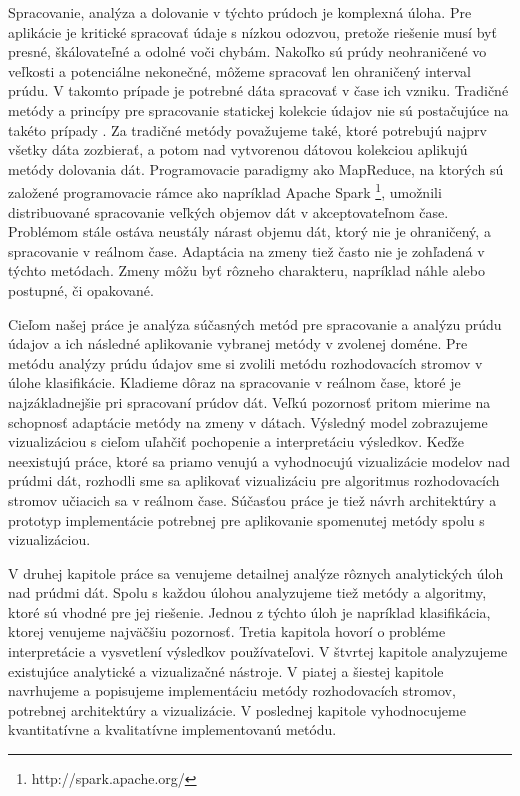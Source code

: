 \par
Spracovanie, analýza a dolovanie v týchto prúdoch je komplexná úloha. Pre aplikácie je kritické spracovať údaje s nízkou odozvou, pretože riešenie musí byť presné, škálovateľné a odolné voči chybám. Nakoľko sú prúdy neohraničené vo veľkosti a potenciálne nekonečné, môžeme spracovať len ohraničený interval prúdu. V takomto prípade je potrebné dáta spracovať v čase ich vzniku. Tradičné metódy a princípy pre spracovanie statickej kolekcie údajov nie sú postačujúce na takéto prípady \citep{krempl2014open, han2011data}. Za tradičné metódy považujeme také, ktoré potrebujú najprv všetky dáta zozbierať, a potom nad vytvorenou dátovou kolekciou aplikujú metódy dolovania dát. Programovacie paradigmy ako MapReduce, na ktorých sú založené programovacie rámce ako napríklad Apache Spark \footnote{http://spark.apache.org/}, umožnili distribuované spracovanie veľkých objemov dát v akceptovateľnom čase. Problémom stále ostáva neustály nárast objemu dát, ktorý nie je ohraničený, a spracovanie v reálnom čase. Adaptácia na zmeny tiež často nie je zohľadená v týchto metódach. Zmeny môžu byť rôzneho charakteru, napríklad náhle alebo postupné, či opakované.
\par
Cieľom našej práce je analýza súčasných metód pre spracovanie a analýzu prúdu údajov a ich následné aplikovanie vybranej metódy v zvolenej doméne. Pre metódu analýzy prúdu údajov sme si zvolili metódu rozhodovacích stromov v úlohe klasifikácie. Kladieme dôraz na spracovanie v reálnom čase, ktoré je najzákladnejšie pri spracovaní prúdov dát. Veľkú pozornosť pritom mierime na schopnosť adaptácie metódy na zmeny v dátach. Výsledný model zobrazujeme vizualizáciou s cieľom uľahčiť pochopenie a interpretáciu výsledkov. Keďže neexistujú práce, ktoré sa priamo venujú a vyhodnocujú vizualizácie modelov nad prúdmi dát, rozhodli sme sa aplikovať vizualizáciu pre algoritmus rozhodovacích stromov učiacich sa v reálnom čase. Súčasťou práce je tiež návrh architektúry a prototyp implementácie potrebnej pre aplikovanie spomenutej metódy spolu s vizualizáciou.
\par
V druhej kapitole práce sa venujeme detailnej analýze rôznych analytických úloh nad prúdmi dát. Spolu s každou úlohou analyzujeme tiež metódy a algoritmy, ktoré sú vhodné pre jej riešenie. Jednou z týchto úloh je napríklad klasifikácia, ktorej venujeme najväčšiu pozornosť. Tretia kapitola hovorí o probléme interpretácie a vysvetlení výsledkov používateľovi. V štvrtej kapitole analyzujeme existujúce analytické a vizualizačné nástroje. V piatej a šiestej kapitole navrhujeme a popisujeme implementáciu metódy rozhodovacích stromov, potrebnej architektúry a vizualizácie. V poslednej kapitole vyhodnocujeme kvantitatívne a kvalitatívne implementovanú metódu.










